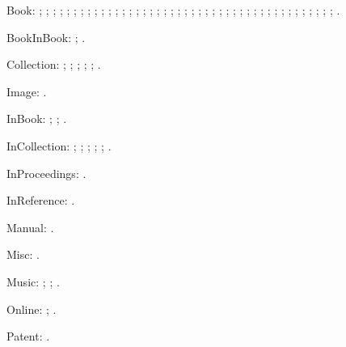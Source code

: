 \documentclass[a4paper,12pt]{report}
\begin{document}
Book: \autocite{barrows:reading}; \autocite{churchill:letters};
\autocite{cohen:schiff}; \autocite{cotton:manufacture};
\autocite{creasey:ashe:blast}; \autocite{creasey:morton:hide};
\autocite{creasey:york:death}; \autocite{davenport:attention};
\autocite{feydeau:farces}; \autocite{furet:passing:eng};
\autocite{furet:passing:fr}; \autocite{hopp:attalid};
\autocite{howell:marriage}; \autocite{lach:asia};
\autocite{lecarre:quest}; \autocite{levistrauss:savage};
\autocite{lynch:webstyle}; \autocite{maisonneuve:relations};
\autocite{mchugh:wake}; \autocite{menchu:crossing};
\autocite{meredith:letters}; \autocite{michelangelo:poems};
\autocite{mla:style}; \autocite{natrecoff:camera};
\autocite{palmatary:pottery}; \autocite{pelikan:christian};
\autocite{rodman:walk}; \autocite{schellinger:novel};
\autocite{sechzer:women}; \autocite{sereny:cries};
\autocite{soltes:georgia}; \autocite{stendhal:parma};
\autocite{suangtho:tectona}; \autocite{thompson:making};
\autocite{tillich:system}; \autocite{times:guide};
\autocite{turabian:manual}; \autocite{walker:columbia};
\autocite{wauchope:ceramics}; \autocite{weber:saugetiere};
\autocite{weresz}; \autocite{white:total};
\autocite{wright:evolution}; \autocite{wright:theory}.

BookInBook: \autocite{bernhard:boris}; \autocite{bernhard:ritter}.

Collection: \autocite{brush:ornithology};
\autocite{harley:cartography}; \autocite{harley:ancient:cart};
\autocite{kamrany:economic}; \autocite{prairie:state};
\autocite{zukowsky:chicago}.

Image: \autocite{bedford:photo}.

InBook: \autocite{ashbrook:brain}; \autocite{phibbs:diary};
\autocite{will:cohere}.

InCollection: \autocite{centinel:letters}; \autocite{ellet:galena};
\autocite{keating:dearborn}; \autocite{lippincott:chicago};
\autocite{sirosh:visualcortex}; \autocite{wiens:avian}.

InProceedings: \autocite{frede:inproc}.

InReference: \autocite[absolute]{oed:cdrom}.

Manual: \autocite{dyna:browser}.

Misc: \autocite{roosevelt:speech}.

Music: \autocite{floyd:atom}; \autocite{mozart:figaro};
\autocite{rubinstein:chopin}.

Online: \autocite{harwood:biden}; \autocite{powell:email}.

Patent: \autocite{petroff:impurity}.
\end{document}
